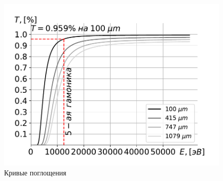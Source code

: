 \documentclass[14pt,a4paper]{extarticle}
\numberwithin{equation}{section}
\begin{document}
	\begin{figure}[h!]
		\centering  
		\includegraphics[width=\textwidth]{pic/bragg_T.pdf}	
		\caption{Кривые поглощения}
		\label{fig:absorb_spec}
	\end{figure}
	
\end{document}
